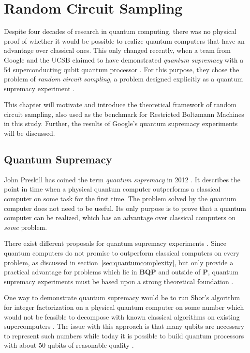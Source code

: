 \chapter{Random Circuit Sampling}

Despite four decades
of research in quantum computing, 
there was no physical proof of whether it would be possible to realize quantum computers
that have an advantage over classical ones. This only changed
recently, when a team from Google and the UCSB claimed to have demonstrated \textit{quantum supremacy}
with a 54 superconducting qubit quantum processor \cite{martines2019supremacy}. For this purpose, they
chose the problem of \textit{random circuit sampling}, a problem designed explicitly
as a quantum supremacy experiment \cite{Boixo2018supremacy}.

This chapter will motivate and introduce the theoretical framework of random circuit
sampling, also used as the benchmark for Restricted Boltzmann Machines in this
study. Further, the results of Google's quantum supremacy experiments will be discussed.

\section{Quantum Supremacy}

John Preskill has coined the term \textit{quantum supremacy} in 2012
\cite{preskill2012quantum}. It describes the point in time when a physical quantum computer
outperforms a classical computer on some task for the first time. The problem
solved by the quantum computer does not need to be useful. Its only purpose is
to prove that a quantum computer can be realized, which has an advantage over
classical computers on \textit{some} problem.

There exist different proposals for quantum supremacy
experiments \cite{shor1997factorisation, aaronson2013boson, Boixo2018supremacy}. Since quantum computers do not promise to outperform classical
computers on every problem, as discussed in section~\ref{sec:quantumcomplexity}, but only provide a
practical advantage for problems which lie in \textbf{BQP} and outside of
\textbf{P}, quantum supremacy experiments must be based upon a strong theoretical foundation \cite{Bernstein93quantumcomplexity}.

One way to demonstrate quantum supremacy would be to run Shor's
algorithm for integer factorization \cite{shor1997factorisation} on a physical quantum computer on some number which would not be feasible
to decompose with known classical algorithms on existing supercomputers \cite{martinlopez2011experimental}. The issue with this approach is that many
qubits are necessary to represent such numbers while today it is possible to
build quantum processors with about 50 qubits of reasonable quality \cite{martines2019supremacy}.


